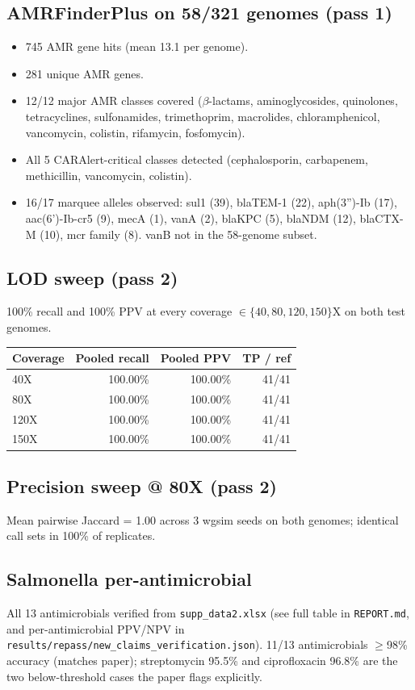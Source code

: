 \documentclass[11pt,a4paper]{article}
\begin{document}
\subsection{AMRFinderPlus on 58/321 genomes (pass 1)}
\begin{itemize}[leftmargin=1.5em]
  \item 745 AMR gene hits (mean 13.1 per genome).
  \item 281 unique AMR genes.
  \item 12/12 major AMR classes covered ($\beta$-lactams, aminoglycosides, quinolones, tetracyclines, sulfonamides, trimethoprim, macrolides, chloramphenicol, vancomycin, colistin, rifamycin, fosfomycin).
  \item All 5 CARAlert-critical classes detected (cephalosporin, carbapenem, methicillin, vancomycin, colistin).
  \item 16/17 marquee alleles observed: sul1 (39), blaTEM-1 (22), aph(3'')-Ib (17), aac(6')-Ib-cr5 (9), mecA (1), vanA (2), blaKPC (5), blaNDM (12), blaCTX-M (10), mcr family (8). vanB not in the 58-genome subset.
\end{itemize}

\subsection{LOD sweep (pass 2)}
100\% recall and 100\% PPV at every coverage $\in \{40, 80, 120, 150\}$X on both test genomes.

\begin{tabular}{@{}lrrr@{}}
\toprule
Coverage & Pooled recall & Pooled PPV & TP / ref \\
\midrule
40X & 100.00\% & 100.00\% & 41/41 \\
80X & 100.00\% & 100.00\% & 41/41 \\
120X & 100.00\% & 100.00\% & 41/41 \\
150X & 100.00\% & 100.00\% & 41/41 \\
\bottomrule
\end{tabular}

\subsection{Precision sweep @ 80X (pass 2)}
Mean pairwise Jaccard = 1.00 across 3 wgsim seeds on both genomes; identical call sets in 100\% of replicates.

\subsection{Salmonella per-antimicrobial}
All 13 antimicrobials verified from \texttt{supp\_data2.xlsx} (see full table in \texttt{REPORT.md}, and per-antimicrobial PPV/NPV in \texttt{results/repass/new\_claims\_verification.json}). 11/13 antimicrobials $\geq$98\% accuracy (matches paper); streptomycin 95.5\% and ciprofloxacin 96.8\% are the two below-threshold cases the paper flags explicitly.
\end{document}

